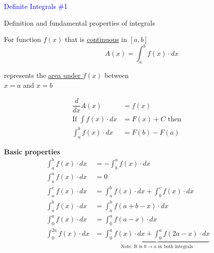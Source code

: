 \documentclass[14pt,fleqn]{extarticle}
\begin{document}
\begin{skill}
\textcolor{blue}{Definite Integrals \#1}

Definition and fundamental properties of integrals 
\end{skill} 

\newcard 

For function $f(x)$ that is \underline{continuous} in $\left[a,b \right]$
\[ \qquad \qquad A(x) = \int_a^b f(x)\cdot dx \]

represents the \underline{area under $f(x)$} between \\$x=a$ and $x=b$

\begin{align}
	\dfrac{d}{dx} A(x) &= f(x) \\ 
	\text{If } \int f(x)\cdot dx &= F(x) + C \text{ then } \\
	\int_a^b f(x)\cdot dx &= F(b) - F(a) 
\end{align}

\textbf{Basic properties} 
\begin{align}
	\int_a^b f(x)\cdot dx &= -\int_b^a f(x)\cdot dx \\
	\int_a^a f(x)\cdot dx &= 0 \\
	\int_a^c f(x)\cdot dx &= \int_a^b f(x)\cdot dx + \int_b^c f(x)\cdot dx \\
	\int_a^b f(x)\cdot dx &= \int_a^b f \left(a+b-x \right)\cdot dx \\
	\int_0^a f(x)\cdot dx &= \int_0^a f \left(a-x \right)\cdot dx \\
	\int_0^{2a} f(x)\cdot dx &= \underbrace{\int_0^a f(x)\cdot dx + \int_0^a f \left(2a-x \right)\cdot dx}_{\text{Note: It is $0\rightarrow a$ in both integrals}}
\end{align}
\end{document}
